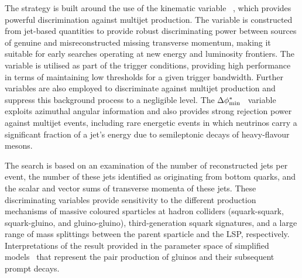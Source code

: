 The strategy is built around the use of the kinematic variable
\alphat~\cite{Randall:2008rw, RA1Paper}, which provides powerful
discrimination against multijet production. The \alphat variable is
constructed from jet-based quantities to provide robust discriminating
power between sources of genuine and misreconstructed missing
transverse momentum, making it suitable for early searches operating
at new energy and luminosity frontiers. The \alphat variable is
utilised as part of the trigger conditions, providing high performance
in terms of maintaining low thresholds for a given trigger
bandwidth. Further variables are also employed to discriminate against
multijet production and suppress this background process to a
negligible level. The $\Delta\phi^{*}_{\rm min}$~\cite{RA1Paper}
variable exploits azimuthal angular information and also provides
strong rejection power against multijet events, including rare
energetic events in which neutrinos carry a significant fraction of a
jet's energy due to semileptonic decays of heavy-flavour mesons.


The search is based on an examination of the number of reconstructed
jets per event, the number of these jets identified as originating
from bottom quarks, and the scalar and vector sums of transverse
momenta of these jets. 
These discriminating variables provide sensitivity to the different
production mechanisms of massive coloured sparticles at hadron
colliders (\ie squark-squark, squark-gluino, and gluino-gluino),
third-generation squark signatures, and a large range of mass
splittings between the parent sparticle and the LSP,
respectively. Interpretations of the result %
 provided in the parameter space of simplified
models~\cite{Alwall:2008ag, Alwall:2008va, sms} that represent the
pair production of gluinos and their subsequent prompt decays.

